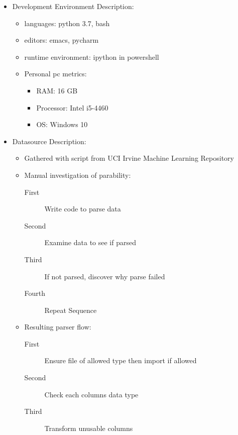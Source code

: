 \documentclass{beamer}
\begin{document}
\begin{frame}[t]
 \begin{itemize}
    \item Development Environment Description:
      \begin{itemize}
         \item languages: python 3.7, bash
         \item editors: emacs, pycharm
         \item runtime environment: ipython in powershell
         \item Personal pc metrics:
           \begin{itemize}
              \item RAM: 16 GB
              \item Processor: Intel i5-4460
              \item OS: Windows 10
           \end{itemize}
      \end{itemize}
     \item Datasource Description:
       \begin{itemize}
           \item Gathered with script from UCI Irvine Machine Learning
                 Repository
           \item Manual investigation of parability:
           \begin{description}
             \item[First]  Write code to parse data
             \item[Second] Examine data to see if parsed
             \item[Third]  If not parsed, discover why parse failed
             \item[Fourth] Repeat Sequence
           \end{description}
           \item Resulting parser flow:
           \begin{description}
              \item[First] Ensure file of allowed type then import if allowed
              \item[Second] Check each columns data type
              \item[Third] Transform unusable columns
           \end{description}
       \end{itemize}
 \end{itemize}
\end{frame}
\end{document}
